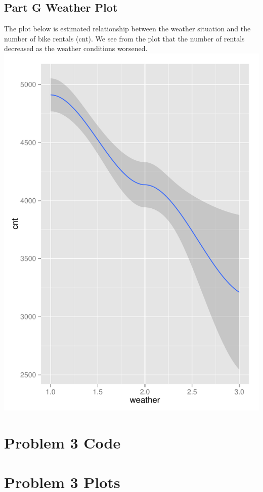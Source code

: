 \documentclass[11pt]{article}
\begin{document}
\subsection{Part G Weather Plot}
\label{subsec:problem2gplotsWeather}
The plot below is estimated relationship between the weather situation and the number of bike rentals (cnt). We see from the plot that the number of rentals decreased as the weather conditions worsened. \newline 
\includegraphics{Problem2G-Weather.pdf}
\pagebreak
\section{Problem 3 Code}
\label{sec:problem3code}

\pagebreak

\section{Problem 3 Plots}
\label{sec:problem3plots}
\end{document}
